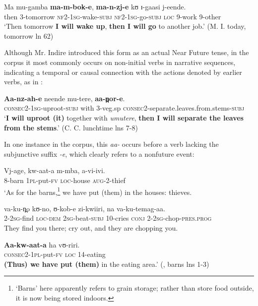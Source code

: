 \documentclass[output=paper]{langsci/langscibook}
\begin{document}
\ea\label{ex:sarvasy:28}
\gll Ma   mu-gamba   \textbf{ma-m-bok-e},     \textbf{ma-n-zj-e}     kʊ   ɪ-gaasi   j-eende. \\
then   3-tomorrow   \textsc{nf2}-\textsc{1sg}-wake-\textsc{subj}  \textsc{nf2}-\textsc{1sg}-go-\textsc{subj}  \textsc{loc}  9-work  9-other \\
\glt ‘Then tomorrow \textbf{I will wake up}, \textbf{then I will go} to another job.’ (M. I. today, tomorrow ln 62)
\z

Although Mr. Indire introduced this form as an actual Near Future tense, in the corpus it most commonly occurs on non-initial verbs in narrative sequences, indicating a temporal or causal connection with the actions denoted by earlier verbs, as in : 

\ea\label{ex:sarvasy:29}
\gll \textbf{Aa-nz-ah-e}       neende   mu-tere,  \textbf{aa-n̪or-e}.\\
\textsc{consec2}-\textsc{1sg}-uproot-\textsc{subj}  with  3-veg.sp  \textsc{consec2}-separate.leaves.from.stems-\textsc{subj} \\
\glt ‘\textbf{I will uproot (it)} together with \textit{umutere}, \textbf{then I will separate the leaves from the stems}.’ (C. C. lunchtime lns 7-8)
\z

In one instance in the corpus, this\textit{ aa-} occurs before a verb lacking the subjunctive suffix \textit{-e}, which clearly refers to a nonfuture event:

\ea\label{ex:sarvasy:30}
\gll Vj-age,     kw-aat-a   m-mba,   a-vi-ivi.\\
8-barn    \textsc{1pl}-put-\textsc{fv}  \textsc{loc}-house  \textsc{aug}-2-thief \\
\glt ‘As for the barns,\footnote{‘Barns’ here apparently refers to grain storage; rather than store food outside, it is now being stored indoors.} we have put (them) in the houses: thieves.

\gll va-ku-n̪o   kʊ-no,   ʊ-kob-e     zi-kwiiri,   na   va-ku-temag-aa. \\
2-\textsc{2sg}-find  \textsc{loc}-\textsc{dem}  \textsc{2sg}-beat-\textsc{subj}  10-cries  \textsc{conj}  2-\textsc{2sg}-chop-\textsc{pres}.\textsc{prog} \\
\glt They find you there; cry out, and they are chopping you. 

\gll \textbf{Aa-kw-aat-a}     ha   vʊ-riri. \\
\textsc{consec2}-\textsc{1pl}-put-\textsc{fv}  \textsc{loc}  14-eating \\
\glt \textbf{(Thus) we have put (them)} in the eating area.’ (\citealt{NicholsSsennyonga1976}, barns lns 1-3)
\z
\end{document}

